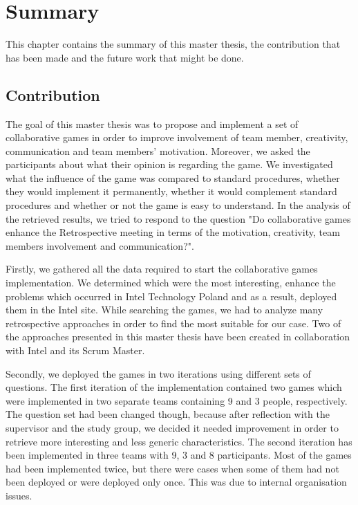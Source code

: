 \chapter{Summary}
This chapter contains the summary of this master thesis, the contribution that has been made and the future work that might be done.

\section{Contribution}

The goal of this master thesis was to propose and implement a set of collaborative games in order to improve involvement of team member, creativity, communication and team members’ motivation. Moreover, we asked the participants about what their opinion is regarding the game. We investigated what the influence of the game was compared to standard procedures, whether they would implement it permanently, whether it would complement standard procedures and whether or not the game is easy to understand. In the analysis of the retrieved results, we tried to respond to the question "Do collaborative games enhance the Retrospective meeting in terms of the motivation, creativity, team members involvement and communication?".

Firstly, we gathered all the data required to start the collaborative games implementation. We determined which were the most interesting, enhance the problems which occurred in Intel Technology Poland and as a result, deployed them in the Intel site. While searching the games, we had to analyze many retrospective approaches in order to find the most suitable for our case. Two of the approaches presented in this master thesis have been created in collaboration with Intel and its Scrum Master.

Secondly, we deployed the games in two iterations using different sets of questions. The first iteration of the implementation contained two games which were implemented in two separate teams containing 9 and 3 people, respectively. The question set had been changed though, because after reflection with the supervisor and the study group, we decided it needed improvement in order to retrieve more interesting and less generic characteristics. The second iteration has been implemented in three teams with 9, 3 and 8 participants. Most of the games had been implemented twice, but there were cases when some of them had not been deployed or were deployed only once. This was due to internal organisation issues.

